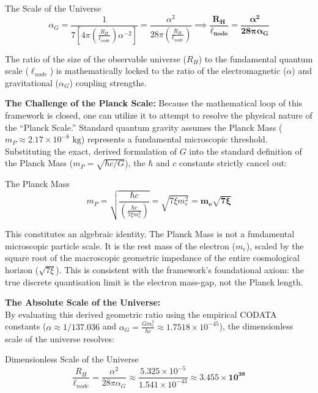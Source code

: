 \begin{resultbox}{The Scale of the Universe}
\begin{equation}
\alpha_{G}=\frac{1}{7\left[4\pi\left(\frac{R_{H}}{\ell_{node}}\right)\alpha^{-2}\right]}=\frac{\alpha^{2}}{28\pi\left(\frac{R_{H}}{\ell_{node}}\right)}\implies \mathbf{\frac{R_{H}}{\ell_{node}}=\frac{\alpha^{2}}{28\pi\alpha_{G}}}
\end{equation}
\end{resultbox}

The ratio of the size of the observable universe ($R_{H}$) to the fundamental quantum scale ($\ell_{node}$) is mathematically locked to the ratio of the electromagnetic ($\alpha$) and gravitational ($\alpha_{G}$) coupling strengths.

\textbf{The Challenge of the Planck Scale:} Because the mathematical loop of this framework is closed, one can utilize it to attempt to resolve the physical nature of the ``Planck Scale.'' Standard quantum gravity assumes the Planck Mass ($m_{P}\approx2.17\times10^{-8}\text{ kg}$) represents a fundamental microscopic threshold. Substituting the exact, derived formulation of $G$ into the standard definition of the Planck Mass ($m_{P}=\sqrt{\hbar c/G}$), the $\hbar$ and $c$ constants strictly cancel out:

\begin{resultbox}{The Planck Mass}
\begin{equation}
m_{P}=\sqrt{\frac{\hbar c}{\left(\frac{\hbar c}{7\xi m_{e}^{2}}\right)}}=\sqrt{7\xi m_{e}^{2}}=\mathbf{m_{e}\sqrt{7\xi}}
\end{equation}
\end{resultbox}

This constitutes an algebraic identity. The Planck Mass is not a fundamental microscopic particle scale. It is the rest mass of the electron ($m_{e}$), scaled by the square root of the macroscopic geometric impedance of the entire cosmological horizon ($\sqrt{7\xi}$). This is consistent with the framework's foundational axiom: the true discrete quantisation limit is the electron mass-gap, not the Planck length.

\vspace{1em}
\noindent\textbf{The Absolute Scale of the Universe:} \\
By evaluating this derived geometric ratio using the empirical CODATA constants ($\alpha \approx 1/137.036$ and $\alpha_G = \frac{G m_e^2}{\hbar c} \approx 1.7518 \times 10^{-45}$), the dimensionless scale of the universe resolves:
\begin{resultbox}{Dimensionless Scale of the Universe}
\begin{equation}
\frac{R_H}{\ell_{node}} = \frac{\alpha^2}{28\pi\alpha_G} \approx \frac{5.325 \times 10^{-5}}{1.541 \times 10^{-43}} \approx \mathbf{3.455 \times 10^{38}}
\end{equation}
\end{resultbox}

